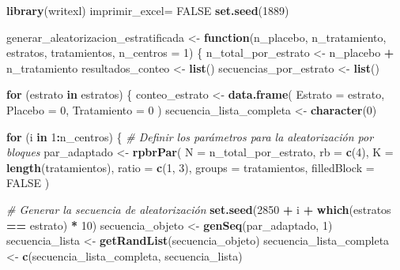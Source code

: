 \documentclass[
]{article}
\newenvironment{Shaded}{\begin{snugshade}}{\end{snugshade}}
\newcommand{\AttributeTok}[1]{\textcolor[rgb]{0.13,0.29,0.53}{#1}}
\newcommand{\CommentTok}[1]{\textcolor[rgb]{0.56,0.35,0.01}{\textit{#1}}}
\newcommand{\ConstantTok}[1]{\textcolor[rgb]{0.56,0.35,0.01}{#1}}
\newcommand{\ControlFlowTok}[1]{\textcolor[rgb]{0.13,0.29,0.53}{\textbf{#1}}}
\newcommand{\DecValTok}[1]{\textcolor[rgb]{0.00,0.00,0.81}{#1}}
\newcommand{\FunctionTok}[1]{\textcolor[rgb]{0.13,0.29,0.53}{\textbf{#1}}}
\newcommand{\NormalTok}[1]{#1}
\newcommand{\OtherTok}[1]{\textcolor[rgb]{0.56,0.35,0.01}{#1}}
\newcommand{\SpecialCharTok}[1]{\textcolor[rgb]{0.81,0.36,0.00}{\textbf{#1}}}
\begin{document}
\begin{Shaded}
\begin{Highlighting}[]
\FunctionTok{library}\NormalTok{(writexl)}
\NormalTok{imprimir\_excel}\OtherTok{=} \ConstantTok{FALSE}
\FunctionTok{set.seed}\NormalTok{(}\DecValTok{1889}\NormalTok{)}

\NormalTok{generar\_aleatorizacion\_estratificada }\OtherTok{\textless{}{-}} \ControlFlowTok{function}\NormalTok{(n\_placebo, n\_tratamiento, estratos, tratamientos, }\AttributeTok{n\_centros =} \DecValTok{1}\NormalTok{) \{}
\NormalTok{  n\_total\_por\_estrato }\OtherTok{\textless{}{-}}\NormalTok{ n\_placebo }\SpecialCharTok{+}\NormalTok{ n\_tratamiento}
\NormalTok{  resultados\_conteo }\OtherTok{\textless{}{-}} \FunctionTok{list}\NormalTok{()}
\NormalTok{  secuencias\_por\_estrato }\OtherTok{\textless{}{-}} \FunctionTok{list}\NormalTok{()}

  \ControlFlowTok{for}\NormalTok{ (estrato }\ControlFlowTok{in}\NormalTok{ estratos) \{}
\NormalTok{    conteo\_estrato }\OtherTok{\textless{}{-}} \FunctionTok{data.frame}\NormalTok{(}
      \AttributeTok{Estrato =}\NormalTok{ estrato,}
      \AttributeTok{Placebo =} \DecValTok{0}\NormalTok{,}
      \AttributeTok{Tratamiento =} \DecValTok{0}
\NormalTok{    )}
\NormalTok{    secuencia\_lista\_completa }\OtherTok{\textless{}{-}} \FunctionTok{character}\NormalTok{(}\DecValTok{0}\NormalTok{)}

    \ControlFlowTok{for}\NormalTok{ (i }\ControlFlowTok{in} \DecValTok{1}\SpecialCharTok{:}\NormalTok{n\_centros) \{}
      \CommentTok{\# Definir los parámetros para la aleatorización por bloques}
\NormalTok{      par\_adaptado }\OtherTok{\textless{}{-}} \FunctionTok{rpbrPar}\NormalTok{(}
        \AttributeTok{N =}\NormalTok{ n\_total\_por\_estrato,}
        \AttributeTok{rb =} \FunctionTok{c}\NormalTok{(}\DecValTok{4}\NormalTok{),}
        \AttributeTok{K =} \FunctionTok{length}\NormalTok{(tratamientos),}
        \AttributeTok{ratio =} \FunctionTok{c}\NormalTok{(}\DecValTok{1}\NormalTok{, }\DecValTok{3}\NormalTok{),}
        \AttributeTok{groups =}\NormalTok{ tratamientos,}
        \AttributeTok{filledBlock =} \ConstantTok{FALSE}
\NormalTok{      )}

      \CommentTok{\# Generar la secuencia de aleatorización}
      \FunctionTok{set.seed}\NormalTok{(}\DecValTok{2850} \SpecialCharTok{+}\NormalTok{ i }\SpecialCharTok{+} \FunctionTok{which}\NormalTok{(estratos }\SpecialCharTok{==}\NormalTok{ estrato) }\SpecialCharTok{*} \DecValTok{10}\NormalTok{)}
\NormalTok{      secuencia\_objeto }\OtherTok{\textless{}{-}} \FunctionTok{genSeq}\NormalTok{(par\_adaptado, }\DecValTok{1}\NormalTok{)}
\NormalTok{      secuencia\_lista }\OtherTok{\textless{}{-}} \FunctionTok{getRandList}\NormalTok{(secuencia\_objeto)}
\NormalTok{      secuencia\_lista\_completa }\OtherTok{\textless{}{-}} \FunctionTok{c}\NormalTok{(secuencia\_lista\_completa, secuencia\_lista)}


\end{Highlighting}
\end{Shaded}
\end{document}
